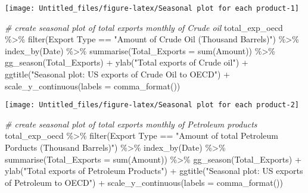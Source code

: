 \documentclass[
]{article}
\newenvironment{Shaded}{\begin{snugshade}}{\end{snugshade}}
\newcommand{\AttributeTok}[1]{\textcolor[rgb]{0.77,0.63,0.00}{#1}}
\newcommand{\CommentTok}[1]{\textcolor[rgb]{0.56,0.35,0.01}{\textit{#1}}}
\newcommand{\FunctionTok}[1]{\textcolor[rgb]{0.00,0.00,0.00}{#1}}
\newcommand{\NormalTok}[1]{#1}
\newcommand{\SpecialCharTok}[1]{\textcolor[rgb]{0.00,0.00,0.00}{#1}}
\newcommand{\StringTok}[1]{\textcolor[rgb]{0.31,0.60,0.02}{#1}}
\begin{document}
\begin{center}\texttt{[image: Untitled\_files/figure-latex/Seasonal plot for each product-1]} \end{center}

\begin{Shaded}
\begin{Highlighting}[]
\CommentTok{\# create seasonal plot of total exports monthly of Crude oil}
\NormalTok{total\_exp\_oecd }\SpecialCharTok{\%\textgreater{}\%} \FunctionTok{filter}\NormalTok{(}\StringTok{\textasciigrave{}}\AttributeTok{Export Type}\StringTok{\textasciigrave{}} \SpecialCharTok{==} \StringTok{"Amount of Crude Oil (Thousand Barrels)"}\NormalTok{) }\SpecialCharTok{\%\textgreater{}\%} 
  \FunctionTok{index\_by}\NormalTok{(Date) }\SpecialCharTok{\%\textgreater{}\%} 
  \FunctionTok{summarise}\NormalTok{(}\AttributeTok{Total\_Exports =} \FunctionTok{sum}\NormalTok{(}\StringTok{\textasciigrave{}}\AttributeTok{Amount}\StringTok{\textasciigrave{}}\NormalTok{)) }\SpecialCharTok{\%\textgreater{}\%} 
  \FunctionTok{gg\_season}\NormalTok{(Total\_Exports) }\SpecialCharTok{+}
  \FunctionTok{ylab}\NormalTok{(}\StringTok{"Total exports  of Crude oil"}\NormalTok{) }\SpecialCharTok{+}
  \FunctionTok{ggtitle}\NormalTok{(}\StringTok{"Seasonal plot: US exports of Crude Oil to OECD"}\NormalTok{) }\SpecialCharTok{+}
  \FunctionTok{scale\_y\_continuous}\NormalTok{(}\AttributeTok{labels =} \FunctionTok{comma\_format}\NormalTok{())}
\end{Highlighting}
\end{Shaded}

\begin{center}\texttt{[image: Untitled\_files/figure-latex/Seasonal plot for each product-2]} \end{center}

\begin{Shaded}
\begin{Highlighting}[]
\CommentTok{\# create seasonal plot of total exports monthly of Petroleum products}
\NormalTok{total\_exp\_oecd }\SpecialCharTok{\%\textgreater{}\%} \FunctionTok{filter}\NormalTok{(}\StringTok{\textasciigrave{}}\AttributeTok{Export Type}\StringTok{\textasciigrave{}} \SpecialCharTok{==} \StringTok{"Amount of total Petroleum Porducts (Thousand Barrels)"}\NormalTok{) }\SpecialCharTok{\%\textgreater{}\%} 
  \FunctionTok{index\_by}\NormalTok{(Date) }\SpecialCharTok{\%\textgreater{}\%} 
  \FunctionTok{summarise}\NormalTok{(}\AttributeTok{Total\_Exports =} \FunctionTok{sum}\NormalTok{(}\StringTok{\textasciigrave{}}\AttributeTok{Amount}\StringTok{\textasciigrave{}}\NormalTok{)) }\SpecialCharTok{\%\textgreater{}\%} 
  \FunctionTok{gg\_season}\NormalTok{(Total\_Exports) }\SpecialCharTok{+}
  \FunctionTok{ylab}\NormalTok{(}\StringTok{"Total exports  of Petroleum Products"}\NormalTok{) }\SpecialCharTok{+}
  \FunctionTok{ggtitle}\NormalTok{(}\StringTok{"Seasonal plot: US exports of Petroleum to OECD"}\NormalTok{) }\SpecialCharTok{+}
  \FunctionTok{scale\_y\_continuous}\NormalTok{(}\AttributeTok{labels =} \FunctionTok{comma\_format}\NormalTok{())}
\end{Highlighting}
\end{Shaded}
\end{document}
